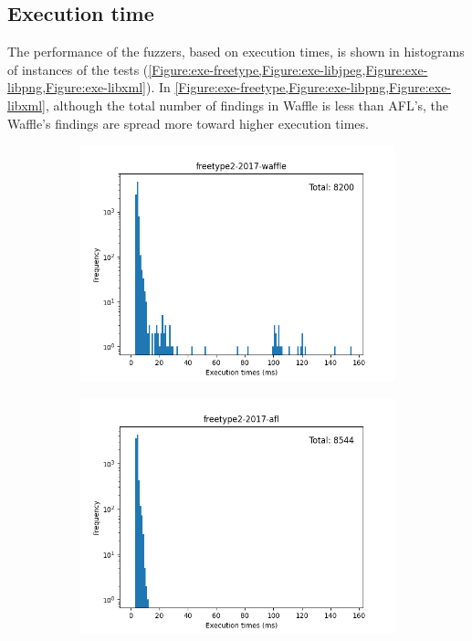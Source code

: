\subsection{Execution time}

The performance of the fuzzers, based on execution times, is shown in histograms of instances of the tests (\cref{Figure:exe-freetype,Figure:exe-libjpeg,Figure:exe-libpng,Figure:exe-libxml}). In \cref{Figure:exe-freetype,Figure:exe-libpng,Figure:exe-libxml}, although the total number of findings in Waffle is less than AFL's, the Waffle's findings are spread more toward higher execution times.

\begin{figure}
    \centering
    \begin{subfigure}[t]{0.475\textwidth}
        \centering
        \includegraphics[width=\textwidth]{Experiments/execs/freetype2-2017-waffle.png}
        \caption{}
        \label{fig:sub:freetype-hist-waffle}
    \end{subfigure}
    \hfill
    \begin{subfigure}[t]{0.475\textwidth}
        \centering
        \includegraphics[width=\textwidth]{Experiments/execs/freetype2-2017-afl.png}

\end{subfigure}
\end{figure}
